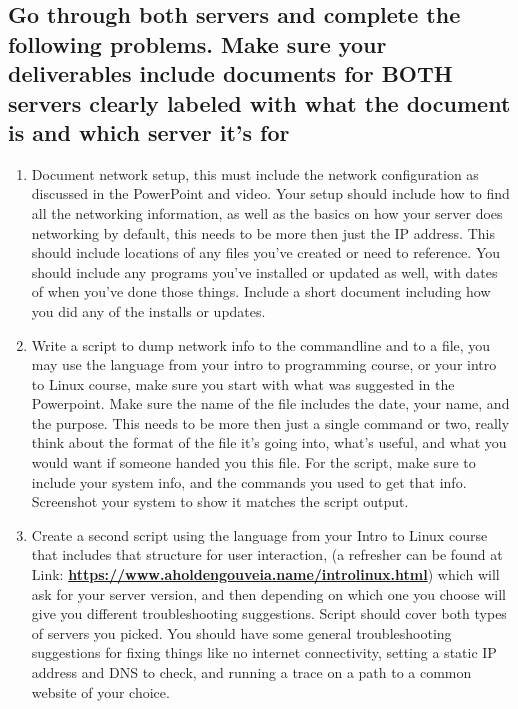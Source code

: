 \documentclass[12pt]{article}
\begin{document}
\subsection*{Go through both servers and complete the following problems.  Make sure your deliverables include documents for BOTH servers clearly labeled with what the document is and which server it's for}
    \begin{enumerate}
        \item Document network setup, this must include the network configuration as discussed in the PowerPoint and video. Your setup should include how to find all the networking information, as well as the basics on how your server does networking by default, this needs to be more then just the IP address. This should include locations of any files you've created or need to reference. You should include any programs you've installed or updated as well, with dates of when you've done those things. Include a short document including how you did any of the installs or updates. 
        \item Write a script to dump network info to the commandline and to a file, you may use the language from your intro to programming course, or your intro to Linux course, make sure you start with what was suggested in the Powerpoint.  Make sure the name of the file includes the date, your name, and the purpose.  This needs to be more then just a single command or two, really think about the format of the file it's going into, what's useful, and what you would want if someone handed you this file. For the script, make sure to include your system info, and the commands you used to get that info. Screenshot your system to show it matches the script output.
        \item Create a second script using the language from your Intro to Linux course that includes that structure for user interaction, (a refresher can be found at Link: \href{https://www.aholdengouveia.name/introlinux.html}{\textbf{https://www.aholdengouveia.name/introlinux.html}}) which will ask for your server version, and then depending on which one you choose will give you different troubleshooting suggestions.  Script should cover both types of servers you picked.  You should have some general troubleshooting suggestions for fixing things like no internet connectivity, setting a static IP address and DNS to check, and running a trace on a path to a common website of your choice. 
    \end{enumerate}
\end{document}
